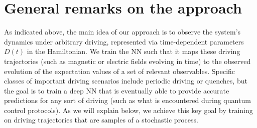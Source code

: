 \documentclass[a4paper,aps,amsmath,amssymb,twocolumn,longbibliography,,accepted=2022-05-17]{quantumarticle}
\begin{document}


\section{General remarks on the approach}


As indicated above, the main idea of our approach is to observe the system's dynamics under arbitrary driving, represented via time-dependent parameters $D(t)$ in the Hamiltonian. We train the NN such that it maps these driving trajectories (such as magnetic or electric fields evolving in time) to the observed evolution of the expectation values of a set of relevant observables. Specific classes of important driving scenarios include periodic driving or quenches, but the goal is to train a deep NN that is eventually able to provide accurate predictions for any sort of driving (such as what is encountered during quantum control protocols). As we will explain below, we achieve this key goal by training on driving trajectories that are samples of a stochastic process.
\end{document}
